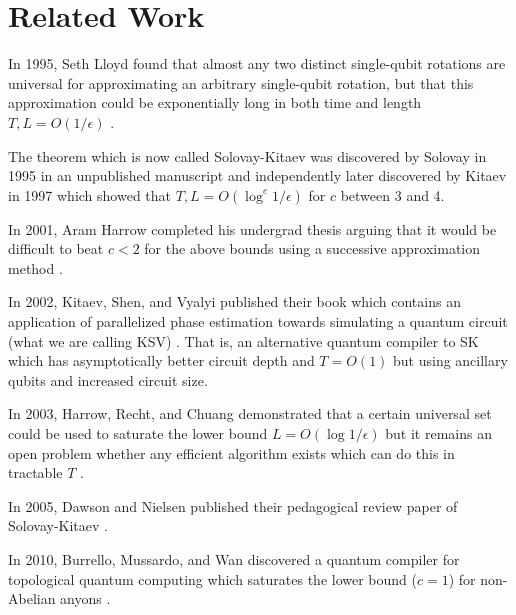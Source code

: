\section{Related Work}
\label{sec:related}

In 1995, Seth Lloyd found that almost any two distinct single-qubit rotations are
universal for approximating an arbitrary single-qubit rotation, but that this
approximation could be exponentially long in both time and length
$T,L = O(1/\epsilon)$ \cite{Lloyd1995}.

The theorem which is now called Solovay-Kitaev was discovered by Solovay in
1995 in an unpublished manuscript and independently later discovered by
Kitaev in 1997 \cite{nc00} which showed that $T,L = O(\log^c{1/\epsilon})$ for
$c$ between 3 and 4.

In 2001, Aram Harrow completed his undergrad thesis arguing that it would be difficult
to beat $c < 2$ for the above bounds using a successive approximation
method \cite{harrow01}.

In 2002, Kitaev, Shen, and Vyalyi published their book which contains an
application of parallelized phase estimation towards simulating a quantum
circuit (what we are calling KSV) \cite{ksv02}.
That is, an alternative quantum compiler to SK which has
asymptotically better circuit depth and $T=O(1)$
but using ancillary qubits and increased
circuit size.

In 2003, Harrow, Recht, and Chuang demonstrated that a certain universal
set could be used to saturate the lower bound $L=O(\log{1/\epsilon})$
but it remains an open problem whether any efficient algorithm exists
which can do this in tractable $T$ \cite{hrc02}.

In 2005, Dawson and Nielsen published their pedagogical review
paper of Solovay-Kitaev \cite{Dawson2005}.

In 2010, Burrello, Mussardo, and Wan discovered a quantum compiler for
topological quantum computing which saturates the lower bound ($c=1$) for
non-Abelian anyons \cite{Burrello2010}.